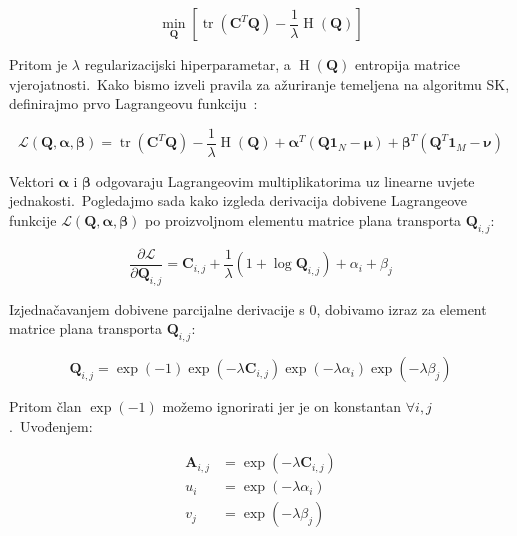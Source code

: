\documentclass[diplomskirad]{fer}
\begin{document}
\begin{equation}
  \min_{\bm{Q}} \left[ \operatorname{tr}(\bm{C}^T \bm{Q}) - \frac{1}{\lambda} \operatorname{H}(\bm{Q}) \right]
  \label{eq:ot_with_entropy_repeat}
\end{equation}

Pritom je $\lambda$ regularizacijski hiperparametar, a $\operatorname{H}(\bm{Q})$ entropija matrice vjerojatnosti.\ Kako bismo izveli pravila za ažuriranje temeljena na algoritmu SK, definirajmo prvo Lagrangeovu funkciju~\cite{slater2013lagrange}:

\begin{equation}
  \mathcal{L}(\bm{Q}, \bm{\alpha}, \bm{\beta}) = \operatorname{tr}(\bm{C}^T \bm{Q}) - \frac{1}{\lambda} \operatorname{H}(\bm{Q}) + \bm{\alpha}^T (\bm{Q} \bm{1}_N - \bm{\mu}) + \bm{\beta}^T (\bm{Q}^T \bm{1}_M - \bm{\nu})
  \label{eq:sk_lagrange}
\end{equation}

Vektori $\bm{\alpha}$ i $\bm{\beta}$ odgovaraju Lagrangeovim multiplikatorima uz linearne uvjete jednakosti.\ Pogledajmo sada kako izgleda derivacija dobivene Lagrangeove funkcije $\mathcal{L}(\bm{Q}, \bm{\alpha}, \bm{\beta})$ po proizvoljnom elementu matrice plana transporta $\bm{Q}_{i,j}$:

\begin{equation}
  \frac{\partial \mathcal{L}}{\partial \bm{Q}_{i,j}} = \bm{C}_{i,j} + \frac{1}{\lambda} (1 + \log \bm{Q}_{i,j}) + \alpha_{i} + \beta_{j}
  \label{eq:sk_deriv}
\end{equation}

Izjednačavanjem dobivene parcijalne derivacije s $0$, dobivamo izraz za element matrice plana transporta $\bm{Q}_{i,j}$:

\begin{equation}
  \bm{Q}_{i,j} = \exp(-1) \exp(-\lambda \bm{C}_{i,j}) \exp(-\lambda \alpha_{i}) \exp(-\lambda \beta_{j})
  \label{eq:sk_one_el}
\end{equation}

Pritom član $\exp(-1)$ možemo ignorirati jer je on konstantan $\forall i,j$.\ Uvođenjem:

\begin{equation}
  \begin{aligned}
    \bm{A}_{i,j} &= \exp(-\lambda \bm{C}_{i,j}) \\
    u_{i} &= \exp(-\lambda \alpha_{i}) \\
    v_{j} &= \exp(-\lambda \beta_{j}) \\
  \end{aligned}
  \label{eq:sk_alias}
\end{equation}
\end{document}
